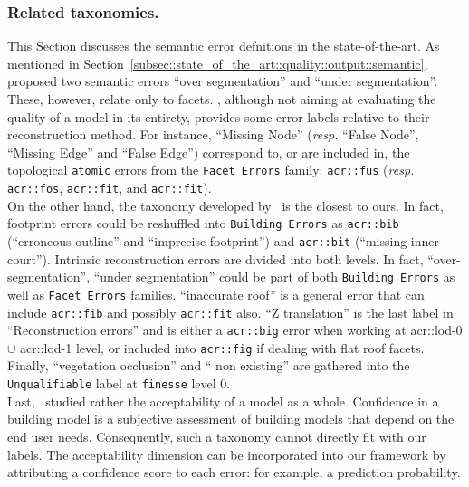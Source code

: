         \subsubsection{Related taxonomies.}
            This Section discusses the semantic error defnitions in the state-of-the-art.
            As mentioned in Section~\ref{subsec::state_of_the_art::quality::output::semantic},~\textcite{rottensteiner2012isprs} proposed two semantic errors ``over segmentation'' and ``under segmentation''.
            These, however, relate only to facets.
            \textcite{xiong2014graph}, although not aiming at evaluating the quality of a model in its entirety, provides some error labels relative to their reconstruction method.
            For instance, ``Missing Node'' (\textit{resp.} ``False Node'', ``Missing Edge'' and ``False Edge'') correspond to, or are included in, the topological \texttt{atomic} errors from the \texttt{Facet Errors} family: \texttt{\gls{acr::fus}} (\textit{resp.} \texttt{\gls{acr::fos}}, \texttt{\gls{acr::fit}}, and \texttt{\gls{acr::fit}}).\\

            On the other hand, the taxonomy developed by~\textcite{michelin2013quality} is the closest to ours.
            In fact, footprint errors could be reshuffled into \texttt{Building Errors} as \texttt{\gls{acr::bib}} (``erroneous outline'' and ``imprecise footprint'') and \texttt{\gls{acr::bit}} (``missing inner court'').
            Intrinsic reconstruction errors are divided into both levels.
            In fact, ``over-segmentation'', ``under segmentation'' could be part of both \texttt{Building Errors} as well as \texttt{Facet Errors} families.
            ``inaccurate roof'' is a general error that can include \texttt{\gls{acr::fib}} and possibly \texttt{\gls{acr::fit}} also.
            ``Z translation'' is the last label in ``Reconstruction errors'' and is either a \texttt{\gls{acr::big}} error when working at \gls{acr::lod}-0 $\cup$ \gls{acr::lod}-1 level, or included into \texttt{\gls{acr::fig}} if dealing with flat roof facets.
            Finally, ``vegetation occlusion'' and `` non existing'' are gathered into the \texttt{Unqualifiable} label at \texttt{finesse} level 0.\\

            Last,~\textcite{boudet2006supervised} studied rather the acceptability of a model as a whole.
            Confidence in a building model is a subjective assessment of building models that depend on the end user needs.
            Consequently, such a taxonomy cannot directly fit with our labels.
            The acceptability dimension can be incorporated into our framework by attributing a confidence score to each error: for example, a prediction probability.        

